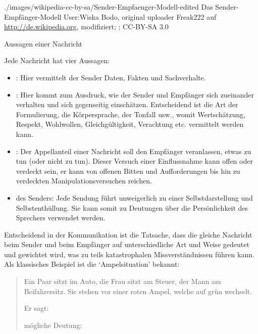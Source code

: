 \documentclass[
ngerman,
paper=a4,
asymmetric,
fontsize=10pt,
draft=false,
numbers=noenddot,
bibtotocnumbered,
footnotes=multiple,
]{scrreprt}
\begin{document}
{}
{}
{}
{./images/wikipedia-cc-by-sa/Sender-Empfaenger-Modell-edited}
{Das Sender-Empfänger-Modell \cite{Informatik3}}
{User:Wiska Bodo, original uploader Freak222
auf \url{http://de.wikipedia.org}, modifiziert; ; CC-BY-SA
3.0}



\Text
{Aussagen einer Nachricht}
{Jede Nachricht hat vier Aussagen:

\begin{itemize}
  \item {}: Hier vermittelt der
  Sender Daten, Fakten und Sachverhalte.
  \item {}: Hier
  kommt zum Ausdruck, wie der Sender und Empfänger sich
  zueinander verhalten und sich gegenseitig einschätzen.
  Entscheidend ist die Art der Formulierung, die
  Körpersprache, der Tonfall usw., womit Wertschätzung, Respekt,
  Wohlwollen, Gleichgültigkeit, Verachtung etc. vermittelt
  werden kann.
  \item {}: Der Appellanteil einer Nachricht
  soll den Empfänger veranlassen, etwas zu tun
  (oder nicht zu tun). 
  Dieser Versuch einer Einflussnahme kann offen oder
  verdeckt sein, er kann von offenen Bitten und
  Aufforderungen bis hin zu verdeckten
  Manipulationsversuchen reichen.
  \item {} des Senders: Jede Sendung
  führt unweigerlich zu einer Selbstdarstellung und Selbstenthüllung.
  Sie kann somit zu Deutungen über die
  Persönlichkeit des Sprechers verwendet werden. 
\end{itemize}

Entscheidend in der Kommunikation ist die Tatsache, dass die
gleiche Nachricht beim Sender und beim Empfänger auf
unterschiedliche Art und Weise gedeutet und gewichtet wird,
was zu teils katastrophalen Missverständnissen führen kann. Als
klassisches Beispiel ist die \enquote*{Ampelsituation}
bekannt: 

\begin{quote}
  Ein Paar sitzt im Auto, die Frau sitzt am Steuer, der Mann
  am Beifahrersitz. Sie stehen vor einer roten Ampel, welche
  auf grün wechselt.
  
  Er sagt: 
  
   mögliche Deutung:\small
  

\end{quote}}
\end{document}

